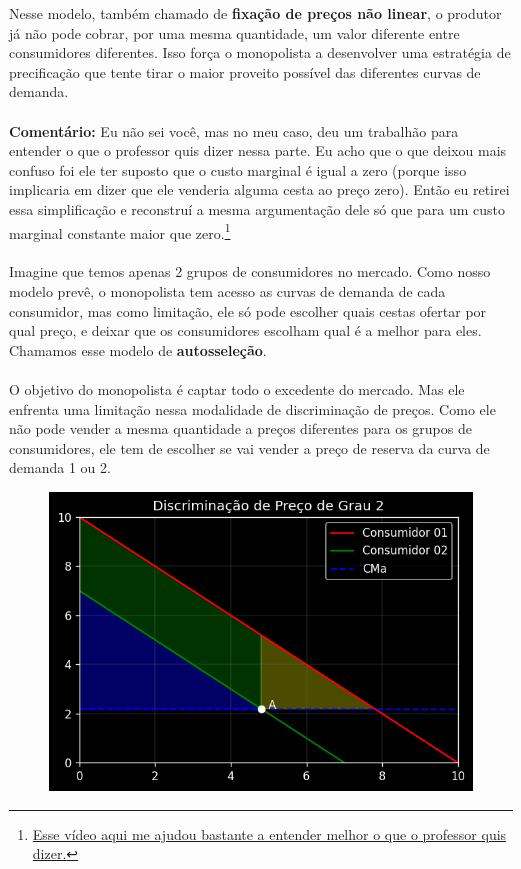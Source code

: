 \documentclass[a4paper,11pt,oneside]{book}
\theoremstyle{definition}
\theoremstyle{break}
\begin{document}
Nesse modelo, também chamado de \textbf{fixação de preços não linear}, o produtor já não pode cobrar, por uma mesma quantidade, um valor diferente entre consumidores diferentes. Isso força o monopolista a desenvolver uma estratégia de precificação que tente tirar o maior proveito possível das diferentes curvas de demanda.
\\~\\
\textbf{Comentário:} Eu não sei você, mas no meu caso, deu um trabalhão para entender o que o professor quis dizer nessa parte. Eu acho que o que deixou mais confuso foi ele ter suposto que o custo marginal é igual a zero (porque isso implicaria em dizer que ele venderia alguma cesta ao preço zero). Então eu retirei essa simplificação e reconstruí a mesma argumentação dele só que para um custo marginal constante maior que zero.\footnote{\href{https://www.youtube.com/watch?v=OBgziVdHH8w}{Esse vídeo aqui me ajudou bastante a entender melhor o que o professor quis dizer.}}
\\~\\
Imagine que temos apenas 2 grupos de consumidores no mercado. Como nosso modelo prevê, o monopolista tem acesso as curvas de demanda de cada consumidor, mas como limitação, ele só pode escolher quais cestas ofertar por qual preço, e deixar que os consumidores escolham qual é a melhor para eles. Chamamos esse modelo de \textbf{autosseleção}.
\\~\\
O objetivo do monopolista é captar todo o excedente do mercado. Mas ele enfrenta uma limitação nessa modalidade de discriminação de preços. Como ele não pode vender a mesma quantidade a preços diferentes para os grupos de consumidores, ele tem de escolher se vai vender a preço de reserva da curva de demanda 1 ou 2.

\begin{figure}[H]
\centering
\includegraphics[scale=0.8]{cap26_3-discriminacao_grau2_1.png}
\end{figure}
\end{document}

